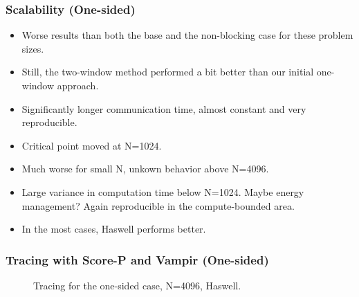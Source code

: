 \documentclass[10pt, compress]{beamer}
\begin{document}
\begin{frame}
  \frametitle{Scalability (One-sided)}
    \begin{itemize}
    \item Worse results than both the base and the non-blocking case for these problem sizes.
    \item Still, the two-window method performed a bit better than our initial one-window approach.
    \item Significantly longer communication time, almost constant and very reproducible.
    \item Critical point moved at N=1024.
    \item Much worse for small N, unkown behavior above N=4096.
    \item Large variance in computation time below N=1024. Maybe energy management? Again reproducible in the compute-bounded area.
    \item In the most cases, Haswell performs better.
  \end{itemize}
\end{frame}

\begin{frame}
  \frametitle{Tracing with Score-P and Vampir (One-sided)}
  \begin{figure}
  \centering
  \caption{Tracing for the one-sided case, N=4096, Haswell.}
  \label{fig:vampir_onesided}
  \end{figure}
\end{frame}
\end{document}
